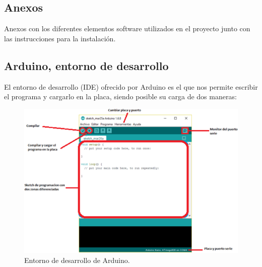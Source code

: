 

\newpage

\begin{appendix}
\backmatter

\chapter{Anexos}
\label{appendix:anexos}

Anexos con los diferentes elementos software utilizados en el proyecto junto con las instrucciones para la instalación.\\

\section{Arduino, entorno de desarrollo}

El entorno de desarrollo (IDE) ofrecido por Arduino es el que nos permite escribir el programa y cargarlo en la placa, siendo posible su carga de dos maneras:

\begin{figure}[H]
  \begin{center}
    \includegraphics[scale=0.3]{imagenes/entorno_desarrollo_arduino.png}
  \end{center}
  \label{fig:logo}
 \caption{Entorno de desarrollo de Arduino.}
\end{figure}


\end{appendix}
